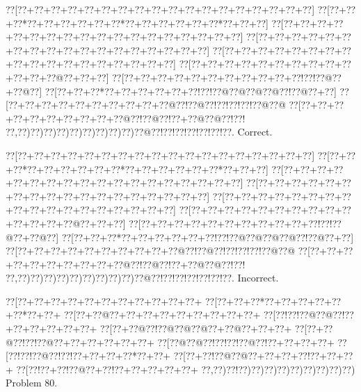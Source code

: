 \documentclass[a5paper]{article}
\begin{document}
\begin{center}
{\goo
\0??[\0??+\0??+\0??+\0??+\0??+\0??+\0??+\0??+\0??+\0??+\0??+\0??+\0??+\0??+\0??+\0??+\0??+\0??]
\0??[\0??+\0??+\0??*\0??+\0??+\0??+\0??+\0??+\0??*\0??+\0??+\0??+\0??+\0??+\0??*\0??+\0??+\0??]
\0??[\0??+\0??+\0??+\0??+\0??+\0??+\0??+\0??+\0??+\0??+\0??+\0??+\0??+\0??+\0??+\0??+\0??+\0??]
\0??[\0??+\0??+\0??+\0??+\0??+\0??+\0??+\0??+\0??+\0??+\0??+\0??+\0??+\0??+\0??+\0??+\0??+\0??]
\0??[\0??+\0??+\0??+\0??+\0??+\0??+\0??+\0??+\0??+\0??+\0??+\0??+\0??+\0??+\0??+\0??+\0??+\0??]
\0??[\0??+\0??+\0??+\0??+\0??+\0??+\0??+\0??+\0??+\0??+\0??+\0??+\0??@\0??+\0??+\0??]
\0??[\0??+\0??+\0??+\0??+\0??+\0??+\0??+\0??+\0??+\0??+\0??!\0??!\0??@\0??+\0??@\0??]
\0??[\0??+\0??+\0??*\0??+\0??+\0??+\0??+\0??+\0??!\0??!\0??@\0??@\0??@\0??@\0??!\0??@\0??+\0??]
\0??[\0??+\0??+\0??+\0??+\0??+\0??+\0??+\0??+\0??+\0??@\0??!\0??@\0??!\0??!\0??!\0??!\0??@\0??@
\0??[\0??+\0??+\0??+\0??+\0??+\0??+\0??+\0??+\0??+\0??@\0??!\0??@\0??!\0??+\0??@\0??@\0??!\0??!
\0??,\0??)\0??)\0??)\0??)\0??)\0??)\0??)\0??)\0??)\0??@\0??!\0??!\0??!\0??!\0??!\0??!\0??.
}
Correct. 

\end{center}
\begin{center}
{\goo
\0??[\0??+\0??+\0??+\0??+\0??+\0??+\0??+\0??+\0??+\0??+\0??+\0??+\0??+\0??+\0??+\0??+\0??+\0??]
\0??[\0??+\0??+\0??*\0??+\0??+\0??+\0??+\0??+\0??*\0??+\0??+\0??+\0??+\0??+\0??*\0??+\0??+\0??]
\0??[\0??+\0??+\0??+\0??+\0??+\0??+\0??+\0??+\0??+\0??+\0??+\0??+\0??+\0??+\0??+\0??+\0??+\0??]
\0??[\0??+\0??+\0??+\0??+\0??+\0??+\0??+\0??+\0??+\0??+\0??+\0??+\0??+\0??+\0??+\0??+\0??+\0??]
\0??[\0??+\0??+\0??+\0??+\0??+\0??+\0??+\0??+\0??+\0??+\0??+\0??+\0??+\0??+\0??+\0??+\0??+\0??]
\0??[\0??+\0??+\0??+\0??+\0??+\0??+\0??+\0??+\0??+\0??+\0??+\0??+\0??+\0??@\0??+\0??+\0??]
\0??[\0??+\0??+\0??+\0??+\0??+\0??+\0??+\0??+\0??+\0??+\0??!\0??!\0??@\0??+\0??@\0??]
\0??[\0??+\0??+\0??*\0??+\0??+\0??+\0??+\0??+\0??!\0??!\0??@\0??@\0??@\0??@\0??!\0??@\0??+\0??]
\0??[\0??+\0??+\0??+\0??+\0??+\0??+\0??+\0??+\0??+\0??@\0??!\0??@\0??!\0??!\0??!\0??!\0??@\0??@
\0??[\0??+\0??+\0??+\0??+\0??+\0??+\0??+\0??+\0??+\0??@\0??!\0??@\0??!\0??+\0??@\0??@\0??!\0??!
\0??,\0??)\0??)\0??)\0??)\0??)\0??)\0??)\0??)\0??)\0??@\0??!\0??!\0??!\0??!\0??!\0??!\0??.
}
Incorrect. 

\end{center}
\newpage
\begin{center}
{\goo
\0??[\0??+\0??+\0??+\0??+\0??+\0??+\0??+\0??+\0??+\0??+\0??+
\0??[\0??+\0??+\0??*\0??+\0??+\0??+\0??+\0??+\0??*\0??+\0??+
\0??[\0??+\0??@\0??+\0??+\0??+\0??+\0??+\0??+\0??+\0??+\0??+
\0??[\0??!\0??!\0??@\0??@\0??!\0??+\0??+\0??+\0??+\0??+\0??+
\0??[\0??+\0??@\0??!\0??@\0??@\0??@\0??+\0??@\0??+\0??+\0??+
\0??[\0??+\0??@\0??!\0??!\0??@\0??+\0??+\0??+\0??+\0??+\0??+
\0??[\0??@\0??@\0??!\0??!\0??!\0??@\0??!\0??+\0??+\0??+\0??+
\0??[\0??!\0??!\0??@\0??!\0??!\0??+\0??+\0??+\0??*\0??+\0??+
\0??[\0??+\0??!\0??@\0??@\0??+\0??+\0??+\0??!\0??+\0??+\0??+
\0??[\0??!\0??+\0??!\0??@\0??+\0??!\0??+\0??+\0??+\0??+\0??+
\0??,\0??)\0??!\0??)\0??)\0??)\0??)\0??)\0??)\0??)\0??)\0??)
}
Problem 80.

\end{center}
\end{document}
